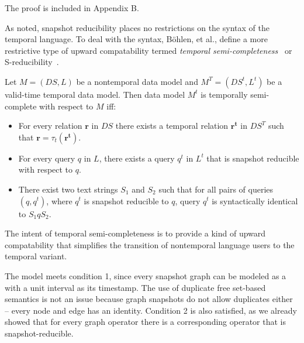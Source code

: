 The proof is included in Appendix B.

As noted, snapshot reducibility places no restrictions on the syntax
of the temporal language.  To deal with the syntax, B{\"{o}}hlen, et
al., define a more restrictive type of upward compatability termed {\em
  temporal semi-completeness}~\cite{Bohlen1995} or
S-reducibility~\cite{Bohlen2000}.

\begin{definition} Let $M = (DS,L)$ be a nontemporal data
model and $M^T = (DS^t,L^t)$ be a valid-time temporal data model.
Then data model $M^t$ is temporally semi-complete with respect to $M$
iff:

\begin{itemize}[noitemsep,itemindent=\dimexpr{}+\relax,leftmargin=5pt]
\item For every relation $\mathbf{r}$ in $DS$ there exists a temporal
  relation $\mathbf{r^t}$ in $DS^T$ such that $\mathbf{r} =
  \tau_t(\mathbf{r^t})$.
\item For every query $q$ in $L$, there exists a query $q^t$ in $L^t$
  that is snapshot reducible with respect to $q$.
\item There exist two text strings $S_1$ and $S_2$ such that for all
  pairs of queries $(q,q^t)$, where $q^t$ is snapshot reducible to
  $q$, query $q^t$ is syntactically identical to $S_1qS_2$.
\end{itemize}
\end{definition}

The intent of temporal semi-completeness is to provide a kind of
upward compatability that simplifies the transition of nontemporal
language users to the temporal variant.  

The \tg model meets condition 1, since every snapshot graph
  can be modeled as a \tg with a unit interval as its timestamp.  The
  use of duplicate free set-based semantics is not an issue because
  graph snapshots do not allow duplicates either -- every node and
  edge has an identity.  Condition 2 is also satisfied, as we already
  showed that for every graph operator there is a corresponding \tga
  operator that is snapshot-reducible.

